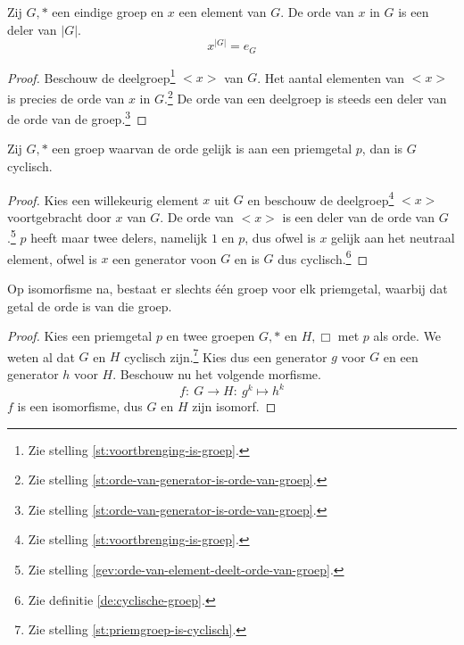 \documentclass[main.tex]{subfiles}
\begin{document}
\begin{gev}
  \label{gev:orde-van-element-deelt-orde-van-groep}
  Zij $G,*$ een eindige groep en $x$ een element van $G$.
  De orde van $x$ in $G$ is een deler van $|G|$.
  \[ x^{|G|} = e_{G} \]

  \begin{proof}
    Beschouw de deelgroep\footnote{Zie stelling \ref{st:voortbrenging-is-groep}.} $<x>$ van $G$.
    Het aantal elementen van $<x>$ is precies de orde van $x$ in $G$.\footnote{Zie stelling \ref{st:orde-van-generator-is-orde-van-groep}.}
    De orde van een deelgroep is steeds een deler van de orde van de groep.\footnote{Zie stelling \ref{st:orde-van-generator-is-orde-van-groep}.}
  \end{proof}
\end{gev}

\begin{st}
  \label{st:priemgroep-is-cyclisch}
  Zij $G,*$ een groep waarvan de orde gelijk is aan een priemgetal $p$, dan is $G$ cyclisch.
  \begin{proof}
    Kies een willekeurig element $x$ uit $G$ en beschouw de deelgroep\footnote{Zie stelling \ref{st:voortbrenging-is-groep}.} $<x>$ voortgebracht door $x$ van $G$.
    De orde van $<x>$ is een deler van de orde van $G$.\footnote{Zie stelling \ref{gev:orde-van-element-deelt-orde-van-groep}.}
    $p$ heeft maar twee delers, namelijk $1$ en $p$, dus ofwel is $x$ gelijk aan het neutraal element, ofwel is $x$ een generator voon $G$ en is $G$ dus cyclisch.\footnote{Zie definitie \ref{de:cyclische-groep}.}
  \end{proof}
\end{st}

\begin{gev}
  Op isomorfisme na, bestaat er slechts \'e\'en groep voor elk priemgetal, waarbij dat getal de orde is van die groep.
  \begin{proof}
    Kies een priemgetal $p$ en twee groepen $G,*$ en $H,\Box$ met $p$ als orde.
    We weten al dat $G$ en $H$ cyclisch zijn.\footnote{Zie stelling \ref{st:priemgroep-is-cyclisch}.}
    Kies dus een generator $g$ voor $G$ en een generator $h$ voor $H$.
    Beschouw nu het volgende morfisme.
    \[ f:\ G \rightarrow H:\ g^{k} \mapsto h^{k} \]
    $f$ is een isomorfisme, dus $G$ en $H$ zijn isomorf.
  \end{proof}
\end{gev}
\end{document}
